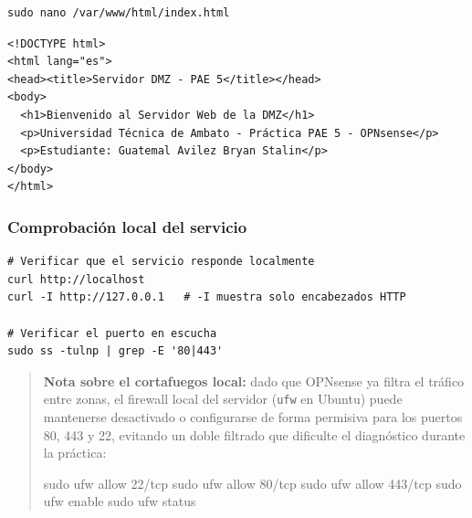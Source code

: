 \documentclass{article}
\newenvironment{Shaded}{}{}
\newcommand{\FunctionTok}[1]{\textcolor[rgb]{0.02,0.16,0.49}{#1}}
\newcommand{\NormalTok}[1]{#1}
\renewcommand{\_}{\oldunderscore\hskip0pt\relax}
\begin{document}
\begin{Verbatim}[fontsize=\footnotesize,frame=single,rulecolor=\color{codebg},fillcolor=\color{codebg},framesep=2mm,xleftmargin=1mm,xrightmargin=1mm,breaklines=true,breakanywhere=true,breaksymbolleft={},breaksymbolright={}]
sudo nano /var/www/html/index.html
\end{Verbatim}

\begin{Verbatim}[fontsize=\footnotesize,frame=single,rulecolor=\color{codebg},fillcolor=\color{codebg},framesep=2mm,xleftmargin=1mm,xrightmargin=1mm,breaklines=true,breakanywhere=true,breaksymbolleft={},breaksymbolright={}]
<!DOCTYPE html>
<html lang="es">
<head><title>Servidor DMZ - PAE 5</title></head>
<body>
  <h1>Bienvenido al Servidor Web de la DMZ</h1>
  <p>Universidad Técnica de Ambato - Práctica PAE 5 - OPNsense</p>
  <p>Estudiante: Guatemal Avilez Bryan Stalin</p>
</body>
</html>
\end{Verbatim}

\hypertarget{comprobaciuxf3n-local-del-servicio}{%
\subsubsection{Comprobación local del
servicio}\label{comprobaciuxf3n-local-del-servicio}}

\begin{Verbatim}[fontsize=\footnotesize,frame=single,rulecolor=\color{codebg},fillcolor=\color{codebg},framesep=2mm,xleftmargin=1mm,xrightmargin=1mm,breaklines=true,breakanywhere=true,breaksymbolleft={},breaksymbolright={}]
# Verificar que el servicio responde localmente
curl http://localhost
curl -I http://127.0.0.1   # -I muestra solo encabezados HTTP

# Verificar el puerto en escucha
sudo ss -tulnp | grep -E '80|443'
\end{Verbatim}

\begin{quote}
\textbf{Nota sobre el cortafuegos local:} dado que OPNsense ya filtra el
tráfico entre zonas, el firewall local del servidor (\texttt{ufw} en
Ubuntu) puede mantenerse desactivado o configurarse de forma permisiva
para los puertos 80, 443 y 22, evitando un doble filtrado que dificulte
el diagnóstico durante la práctica:

\begin{Shaded}
\begin{Highlighting}[]
\FunctionTok{sudo}\NormalTok{ ufw allow 22/tcp}
\FunctionTok{sudo}\NormalTok{ ufw allow 80/tcp}
\FunctionTok{sudo}\NormalTok{ ufw allow 443/tcp}
\FunctionTok{sudo}\NormalTok{ ufw enable}
\FunctionTok{sudo}\NormalTok{ ufw status}
\end{Highlighting}
\end{Shaded}
\end{quote}
\end{document}
